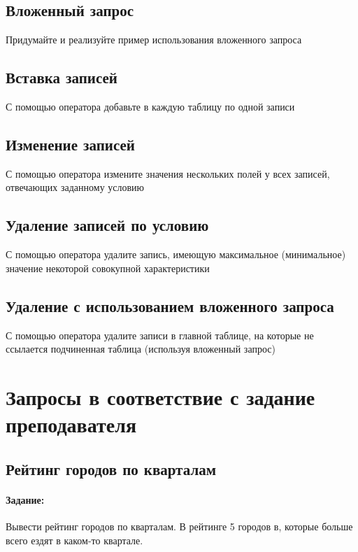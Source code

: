 \subsection{Вложенный запрос}

Придумайте и реализуйте пример использования вложенного запроса

\subsection{Вставка записей}

С помощью оператора  добавьте в каждую таблицу по одной записи

\subsection{Изменение записей}

С помощью оператора  измените значения нескольких полей у всех записей, отвечающих заданному условию

\subsection{Удаление записей по условию}

С помощью оператора  удалите запись, имеющую максимальное (минимальное) значение некоторой совокупной характеристики

\subsection{Удаление с использованием вложенного запроса}

С помощью оператора  удалите записи в главной таблице, на которые не ссылается подчиненная таблица (используя вложенный запрос)

\section{Запросы в соответствие с задание преподавателя}

\subsection{Рейтинг городов по кварталам}

\paragraph{Задание:} Вывести рейтинг городов по кварталам. В рейтинге 5 городов в, которые больше всего ездят в каком-то квартале.

